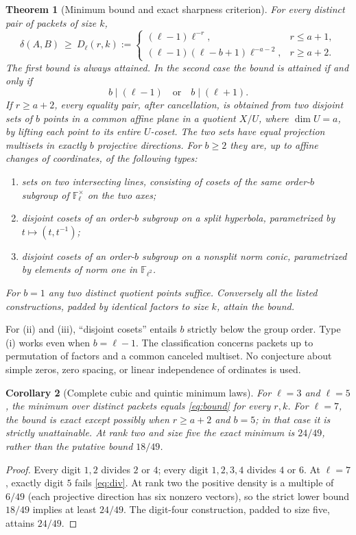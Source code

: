 \documentclass[11pt]{article}
\newtheorem{theorem}{Theorem}[section]
\newtheorem{corollary}[theorem]{Corollary}
\theoremstyle{remark}\newtheorem{remark}[theorem]{Remark}
\newcommand{\F}{\mathbb F}
\begin{document}
\begin{theorem}[Minimum bound and exact sharpness criterion]\label{thm:main}
For every distinct pair of packets of size $k$,
\begin{equation}\label{eq:bound}
 \delta(A,B)\ \ge\ D_\ell(r,k):=\begin{cases}
 (\ell-1)\ell^{-r}, & r\le a+1,\\[2pt]
 (\ell-1)(\ell-b+1)\ell^{-a-2}, & r\ge a+2.
 \end{cases}
\end{equation}
The first bound is always attained. In the second case the bound is attained if and only if
\begin{equation}\label{eq:div}
 b\mid(\ell-1)\quad\text{or}\quad b\mid(\ell+1).
\end{equation}
If $r\ge a+2$, every equality pair, after cancellation, is obtained from two disjoint sets of $b$ points in a common affine plane in a quotient $X/U$, where $\dim U=a$, by lifting each point to its entire $U$-coset. The two sets have equal projection multisets in exactly $b$ projective directions. For $b\ge2$ they are, up to affine changes of coordinates, of the following types:
\begin{enumerate}[label=(\roman*)]
\item sets on two intersecting lines, consisting of cosets of the same order-$b$ subgroup of $\F_\ell^\times$ on the two axes;
\item disjoint cosets of an order-$b$ subgroup on a split hyperbola, parametrized by $t\mapsto(t,t^{-1})$;
\item disjoint cosets of an order-$b$ subgroup on a nonsplit norm conic, parametrized by elements of norm one in $\F_{\ell^2}$.
\end{enumerate}
For $b=1$ any two distinct quotient points suffice. Conversely all the listed constructions, padded by identical factors to size $k$, attain the bound.
\end{theorem}
For (ii) and (iii), ``disjoint cosets'' entails $b$ strictly below the group order. Type (i) works even when $b=\ell-1$. The classification concerns packets up to permutation of factors and a common canceled multiset. No conjecture about simple zeros, zero spacing, or linear independence of ordinates is used.

\begin{corollary}[Complete cubic and quintic minimum laws]\label{cor:small}
For $\ell=3$ and $\ell=5$, the minimum over distinct packets equals \eqref{eq:bound} for every $r,k$. For $\ell=7$, the bound is exact except possibly when $r\ge a+2$ and $b=5$; in that case it is strictly unattainable. At rank two and size five the exact minimum is $24/49$, rather than the putative bound $18/49$.
\end{corollary}
\begin{proof}
Every digit $1,2$ divides $2$ or $4$; every digit $1,2,3,4$ divides $4$ or $6$. At $\ell=7$, exactly digit $5$ fails \eqref{eq:div}. At rank two the positive density is a multiple of $6/49$ (each projective direction has six nonzero vectors), so the strict lower bound $18/49$ implies at least $24/49$. The digit-four construction, padded to size five, attains $24/49$.
\end{proof}
\end{document}
